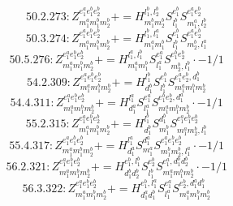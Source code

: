 \documentclass[letterpaper,10pt,fleqn,leqno,onecolumn]{article}
\begin{document}
\begin{equation} \;\;\;\;\;\;  50.2.273: Z^{e_{1}^{a}e_{1}^{b}e_{2}^{b}}_{m_{1}^{a}m_{1}^{b}m_{2}^{b}}+=H^{l_{1}^{b},l_{2}^{b}}_{m_{1}^{b}m_{2}^{b}}S^{e_{1}^{b}}_{l_{1}^{b}}S^{e_{1}^{a}e_{2}^{b}}_{m_{1}^{a},l_{2}^{b}} \end{equation}
\begin{equation} \;\;\;\;\;\;  50.3.274: Z^{e_{1}^{a}e_{1}^{b}e_{2}^{b}}_{m_{1}^{a}m_{1}^{b}m_{2}^{b}}+=H^{l_{1}^{b},l_{1}^{a}}_{m_{1}^{a}m_{1}^{b}}S^{e_{1}^{b}}_{l_{1}^{b}}S^{e_{1}^{a}e_{2}^{b}}_{m_{2}^{b},l_{1}^{a}} \end{equation}
\begin{equation} \;\;\;\;\;\;  50.5.276: Z^{e_{1}^{a}e_{1}^{b}e_{2}^{b}}_{m_{1}^{a}m_{1}^{b}m_{2}^{b}}+=H^{l_{1}^{a},l_{1}^{b}}_{m_{1}^{a}m_{1}^{b}}S^{e_{1}^{a}}_{l_{1}^{a}}S^{e_{1}^{b}e_{2}^{b}}_{m_{2}^{b},l_{1}^{b}}\cdot -1/1 \end{equation}
\begin{equation} \;\;\;\;\;\;  54.2.309: Z^{e_{1}^{a}e_{1}^{b}e_{2}^{b}}_{m_{1}^{a}m_{1}^{b}m_{2}^{b}}+=H^{l_{1}^{b}}_{d_{1}^{b}}S^{e_{1}^{b}}_{l_{1}^{b}}S^{e_{1}^{a}e_{2}^{b},d_{1}^{b}}_{m_{1}^{a}m_{1}^{b}m_{2}^{b}} \end{equation}
\begin{equation} \;\;\;\;\;\;  54.4.311: Z^{e_{1}^{a}e_{1}^{b}e_{2}^{b}}_{m_{1}^{a}m_{1}^{b}m_{2}^{b}}+=H^{l_{1}^{a}}_{d_{1}^{a}}S^{e_{1}^{a}}_{l_{1}^{a}}S^{e_{1}^{b}e_{2}^{b},d_{1}^{a}}_{m_{1}^{a}m_{1}^{b}m_{2}^{b}}\cdot -1/1 \end{equation}
\begin{equation} \;\;\;\;\;\;  55.2.315: Z^{e_{1}^{a}e_{1}^{b}e_{2}^{b}}_{m_{1}^{a}m_{1}^{b}m_{2}^{b}}+=H^{l_{1}^{b}}_{d_{1}^{b}}S^{d_{1}^{b}}_{m_{1}^{b}}S^{e_{1}^{a}e_{1}^{b}e_{2}^{b}}_{m_{1}^{a}m_{2}^{b},l_{1}^{b}} \end{equation}
\begin{equation} \;\;\;\;\;\;  55.4.317: Z^{e_{1}^{a}e_{1}^{b}e_{2}^{b}}_{m_{1}^{a}m_{1}^{b}m_{2}^{b}}+=H^{l_{1}^{a}}_{d_{1}^{a}}S^{d_{1}^{a}}_{m_{1}^{a}}S^{e_{1}^{a}e_{1}^{b}e_{2}^{b}}_{m_{1}^{b}m_{2}^{b},l_{1}^{a}}\cdot -1/1 \end{equation}
\begin{equation} \;\;\;\;\;\;  56.2.321: Z^{e_{1}^{a}e_{1}^{b}e_{2}^{b}}_{m_{1}^{a}m_{1}^{b}m_{2}^{b}}+=H^{e_{1}^{b},l_{1}^{b}}_{d_{1}^{b}d_{2}^{b}}S^{e_{2}^{b}}_{l_{1}^{b}}S^{e_{1}^{a},d_{1}^{b}d_{2}^{b}}_{m_{1}^{a}m_{1}^{b}m_{2}^{b}}\cdot -1/1 \end{equation}
\begin{equation} \;\;\;\;\;\;  56.3.322: Z^{e_{1}^{a}e_{1}^{b}e_{2}^{b}}_{m_{1}^{a}m_{1}^{b}m_{2}^{b}}+=H^{e_{1}^{b},l_{1}^{a}}_{d_{1}^{a}d_{1}^{b}}S^{e_{1}^{a}}_{l_{1}^{a}}S^{e_{2}^{b},d_{1}^{a}d_{1}^{b}}_{m_{1}^{a}m_{1}^{b}m_{2}^{b}} \end{equation}
\end{document}
